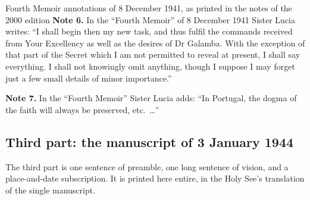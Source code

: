 \begin{operativetext}{Fourth Memoir annotations of 8 December 1941, as
printed in the notes of the 2000 edition}
\textbf{Note 6.} In the ``Fourth Memoir'' of 8 December 1941 Sister
Lucia writes: ``I shall begin then my new task, and thus fulfil the
commands received from Your Excellency as well as the desires of
Dr Galamba. With the exception of that part of the Secret which I am
not permitted to reveal at present, I shall say everything. I shall
not knowingly omit anything, though I suppose I may forget just a few
small details of minor importance.''
\par\medskip
\textbf{Note 7.} In the ``Fourth Memoir'' Sister Lucia adds: ``In
Portugal, the dogma of the faith will always be preserved,
etc.\ \ldots''
\end{operativetext}

\subsection{Third part: the manuscript of 3 January 1944}

The third part is one sentence of preamble, one long sentence of
vision, and a place-and-date subscription. It is printed here entire,
in the Holy See's translation of the single manuscript.

